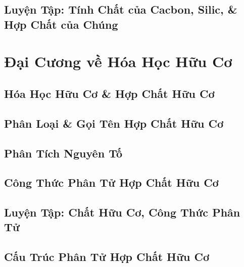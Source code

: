 \documentclass[oneside]{book}
\numberwithin{equation}{section}
\begin{document}

\section{Luyện Tập: Tính Chất của Cacbon, Silic, \& Hợp Chất của Chúng}


\chapter{Đại Cương về Hóa Học Hữu Cơ}

\section{Hóa Học Hữu Cơ \& Hợp Chất Hữu Cơ}


\section{Phân Loại \& Gọi Tên Hợp Chất Hữu Cơ}


\section{Phân Tích Nguyên Tố}


\section{Công Thức Phân Tử Hợp Chất Hữu Cơ}


\section{Luyện Tập: Chất Hữu Cơ, Công Thức Phân Tử}


\section{Cấu Trúc Phân Tử Hợp Chất Hữu Cơ}
\end{document}
